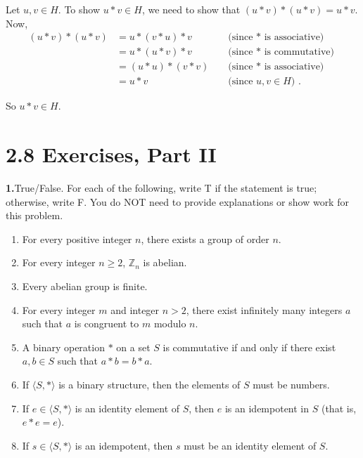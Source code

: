 \documentclass[10pt,]{book}
\theoremstyle{plain}
\theoremstyle{definition}
\theoremstyle{definition}
\theoremstyle{definition}
\theoremstyle{definition}
\numberwithin{equation}{section}
\def\Z{\mathbb{Z}}
\newcommand{\amp}{&}
\begin{document}
\par\smallskip
Let \(u,v\in H\). To show \(u*v\in H\), we need to show that \((u*v)*(u*v)=u*v\). Now,%
\begin{align*}
(u*v)*(u*v)\amp =u*(v*u)*v \amp \amp \text{ (since \(*\) is associative) }\\
\amp =u*(u*v)*v \amp \amp \text{ (since \(*\) is commutative) }\\
\amp =(u*u)*(v*v) \amp \amp \text{ (since \(*\) is associative) }\\
\amp =u*v \amp \amp \text{ (since \(u,v\in H\)) } .
\end{align*}
%
\par
So \(u*v\in H\).%
\par\smallskip
\section*{2.8 Exercises, Part II}
\noindent\textbf{1.}\quad{}True/False. For each of the following, write T if the statement is true; otherwise, write F. You do NOT need to provide explanations or show work for this problem. \leavevmode%
\begin{enumerate}[label=(\alph*)]
\item\hypertarget{li-98}{}For every positive integer \(n\), there exists a group of order \(n\).%
\item\hypertarget{li-99}{}For every integer \(n\geq 2\), \(\Z_n\) is abelian.%
\item\hypertarget{li-100}{}Every abelian group is finite.%
\item\hypertarget{li-101}{}For every integer \(m\) and integer \(n>2\), there exist infinitely many integers \(a\) such that \(a\) is congruent to \(m\) modulo \(n\).%
\item\hypertarget{li-102}{}A binary operation \(*\) on a set \(S\) is commutative if and only if there exist \(a,b\in S\) such that \(a*b=b*a\).%
\item\hypertarget{li-103}{}If \(\langle S, *\rangle\) is a binary structure, then the elements of \(S\) must be numbers.%
\item\hypertarget{li-104}{}If \(e\in \langle S,*\rangle\) is an identity element of \(S\), then \(e\) is an idempotent in \(S\) (that is, \(e*e=e\)).%
\item\hypertarget{li-105}{}If \(s\in \langle S,*\rangle\) is an idempotent, then \(s\) must be an identity element of \(S\).%
\end{enumerate}
%
\par\smallskip
\end{document}
